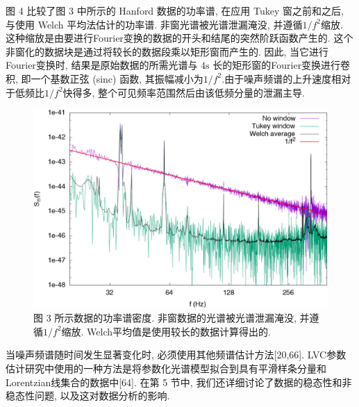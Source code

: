 \documentclass[a4paper]{\documentclassname}
\def\t{\text}
\theoremstyle{definition}
\begin{document}
图 4 比较了图 3 中所示的 Hanford 数据的功率谱, 在应用 Tukey 窗之前和之后, 与使用 Welch 平均法估计的功率谱. 非窗光谱被光谱泄漏淹没, 并遵循$ 1/f^2$缩放. 这种缩放是由要进行Fourier变换的数据的开头和结尾的突然阶跃函数产生的. 这个非窗化的数据块是通过将较长的数据段乘以矩形窗而产生的. 因此, 当它进行Fourier变换时, 结果是原始数据的所需光谱与 $4\t{s}$ 长的矩形窗的Fourier变换进行卷积, 即一个基数正弦  (sinc)  函数, 其振幅减小为$ 1/f^2$.由于噪声频谱的上升速度相对于低频比$ 1/f^2$快得多, 整个可见频率范围然后由该低频分量的泄漏主导. 
\begin{figure}[htbp]
    \centering
    \includegraphics{img/4.jpg}
    \caption{
        图 3 所示数据的功率谱密度. 非窗数据的光谱被光谱泄漏淹没, 并遵循$ 1/f^2$缩放. Welch平均值是使用较长的数据计算得出的. 
    }
\end{figure}

当噪声频谱随时间发生显著变化时, 必须使用其他频谱估计方法[20,66].  LVC参数估计研究中使用的一种方法是将参数化光谱模型拟合到具有平滑样条分量和Lorentzian线集合的数据中[64]. 在第 5 节中, 我们还详细讨论了数据的稳态性和非稳态性问题, 以及这对数据分析的影响. 
\end{document}
